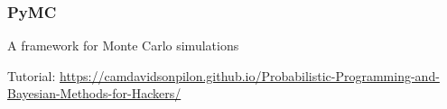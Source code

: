 \begin{frame}\frametitle{PyMC}

    A framework for Monte Carlo simulations

    \vfill

    Tutorial: \url{https://camdavidsonpilon.github.io/Probabilistic-Programming-and-Bayesian-Methods-for-Hackers/}

\end{frame}














